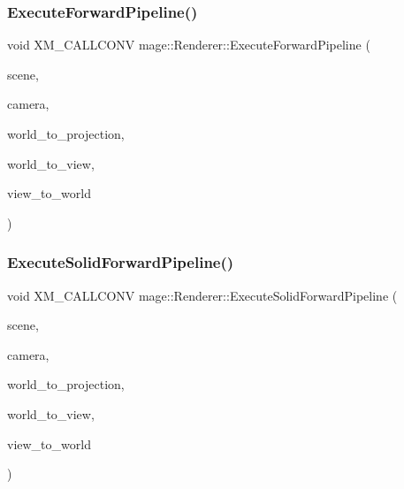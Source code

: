 \hypertarget{classmage_1_1_renderer_afd977cdfa89847cc0529e0b793af9988}{}\label{classmage_1_1_renderer_afd977cdfa89847cc0529e0b793af9988} 
\subsubsection{\texorpdfstring{Execute\+Forward\+Pipeline()}{ExecuteForwardPipeline()}}
{\footnotesize\ttfamily void X\+M\+\_\+\+C\+A\+L\+L\+C\+O\+NV mage\+::\+Renderer\+::\+Execute\+Forward\+Pipeline (\begin{DoxyParamCaption}\item[{const \hyperlink{classmage_1_1_scene}{Scene} \&}]{scene,  }\item[{const \hyperlink{classmage_1_1_camera}{Camera} \&}]{camera,  }\item[{F\+X\+M\+M\+A\+T\+R\+IX}]{world\+\_\+to\+\_\+projection,  }\item[{C\+X\+M\+M\+A\+T\+R\+IX}]{world\+\_\+to\+\_\+view,  }\item[{C\+X\+M\+M\+A\+T\+R\+IX}]{view\+\_\+to\+\_\+world }\end{DoxyParamCaption})\hspace{0.3cm}{\ttfamily [private]}}

\hypertarget{classmage_1_1_renderer_af262c5909fc943477d9723828987c0d5}{}\label{classmage_1_1_renderer_af262c5909fc943477d9723828987c0d5} 
\subsubsection{\texorpdfstring{Execute\+Solid\+Forward\+Pipeline()}{ExecuteSolidForwardPipeline()}}
{\footnotesize\ttfamily void X\+M\+\_\+\+C\+A\+L\+L\+C\+O\+NV mage\+::\+Renderer\+::\+Execute\+Solid\+Forward\+Pipeline (\begin{DoxyParamCaption}\item[{const \hyperlink{classmage_1_1_scene}{Scene} \&}]{scene,  }\item[{const \hyperlink{classmage_1_1_camera}{Camera} \&}]{camera,  }\item[{F\+X\+M\+M\+A\+T\+R\+IX}]{world\+\_\+to\+\_\+projection,  }\item[{C\+X\+M\+M\+A\+T\+R\+IX}]{world\+\_\+to\+\_\+view,  }\item[{C\+X\+M\+M\+A\+T\+R\+IX}]{view\+\_\+to\+\_\+world }\end{DoxyParamCaption})\hspace{0.3cm}{\ttfamily [private]}}

